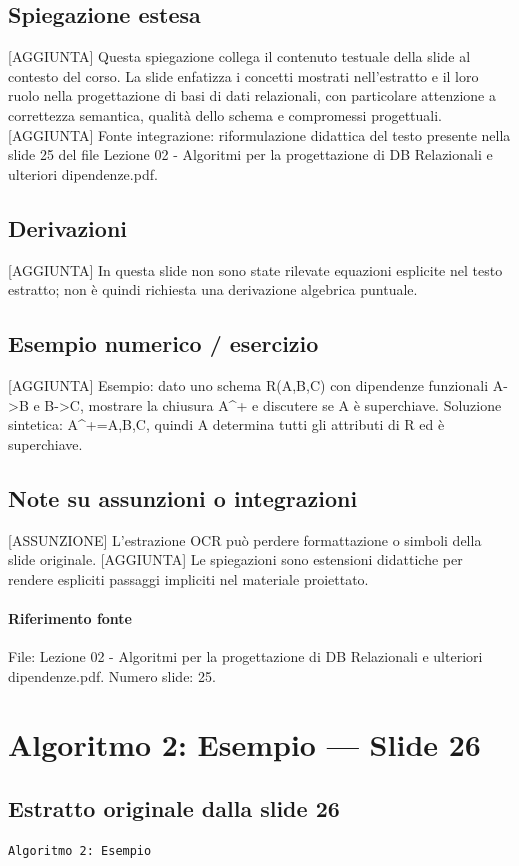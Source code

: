 \documentclass[11pt]{article}
\begin{document}
\subsection*{Spiegazione estesa}
[AGGIUNTA] Questa spiegazione collega il contenuto testuale della slide al contesto del corso. La slide enfatizza i concetti mostrati nell'estratto e il loro ruolo nella progettazione di basi di dati relazionali, con particolare attenzione a correttezza semantica, qualità dello schema e compromessi progettuali.
[AGGIUNTA] Fonte integrazione: riformulazione didattica del testo presente nella slide 25 del file Lezione 02 - Algoritmi per la progettazione di DB Relazionali e ulteriori dipendenze.pdf.
\subsection*{Derivazioni}
[AGGIUNTA] In questa slide non sono state rilevate equazioni esplicite nel testo estratto; non è quindi richiesta una derivazione algebrica puntuale.
\subsection*{Esempio numerico / esercizio}
[AGGIUNTA] Esempio: dato uno schema R(A,B,C) con dipendenze funzionali A->B e B->C, mostrare la chiusura A^+ e discutere se A è superchiave. Soluzione sintetica: A^+={A,B,C}, quindi A determina tutti gli attributi di R ed è superchiave.
\subsection*{Note su assunzioni o integrazioni}
[ASSUNZIONE] L'estrazione OCR può perdere formattazione o simboli della slide originale.
[AGGIUNTA] Le spiegazioni sono estensioni didattiche per rendere espliciti passaggi impliciti nel materiale proiettato.
\paragraph{Riferimento fonte} File: Lezione 02 - Algoritmi per la progettazione di DB Relazionali e ulteriori dipendenze.pdf. Numero slide: 25.
\section{Algoritmo 2: Esempio --- Slide 26}
\subsection*{Estratto originale dalla slide 26}
\begin{lstlisting}
Algoritmo 2: Esempio
\end{lstlisting}
\end{document}
